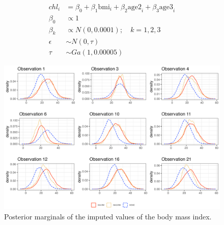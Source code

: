 \documentclass[
]{article}
\begin{document}
\begin{equation}\label{missingCovariatesEquation}
\begin{split}
chl_i &= \beta_{0} + \beta_{1}\text{bmi}_i + \beta_{2}\text{age2}_i + \beta_{3}\text{age3}_i \\
\beta_0 & \propto 1 \\
\beta_k & \propto N(0, 0.0001); \quad k = 1, 2, 3 \\
\epsilon & \sim N(0, \tau)\\
\tau & \sim Ga(1, 0.00005)
\end{split}
\end{equation}

\begin{figure}

{\centering \includegraphics{results/missingRegression.png}

}

\caption{\label{fig-missingPlot}Posterior marginals of the imputed
values of the body mass index.}

\end{figure}
\end{document}
